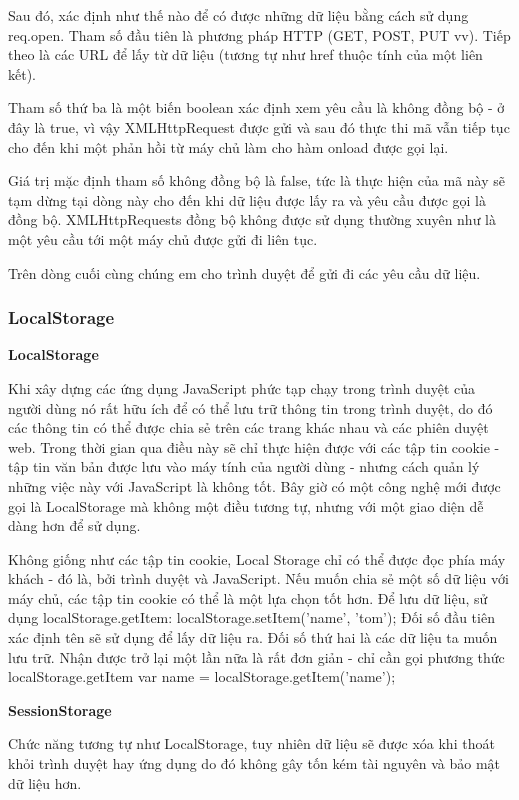 Sau đó, xác định như thế nào để có được những dữ liệu bằng cách sử dụng req.open. Tham số đầu tiên là phương pháp HTTP (GET, POST, PUT vv). Tiếp theo là các URL để lấy từ dữ liệu (tương tự như href thuộc tính của một liên kết).

Tham số thứ ba là một biến boolean xác định xem yêu cầu là không đồng bộ - ở đây là true, vì vậy XMLHttpRequest được gửi và sau đó thực thi mã vẫn tiếp tục cho đến khi một phản hồi từ máy chủ làm cho hàm onload được gọi lại.

Giá trị mặc định tham số không đồng bộ là false, tức là thực hiện của mã này sẽ tạm dừng tại dòng này cho đến khi dữ liệu được lấy ra và yêu cầu được gọi là đồng bộ. XMLHttpRequests đồng bộ không được sử dụng thường xuyên như là một yêu cầu tới một máy chủ được gửi đi liên tục.

Trên dòng cuối cùng chúng em cho trình duyệt để gửi đi các yêu cầu dữ liệu.

\subsubsection{LocalStorage}

\textbf{LocalStorage}

Khi xây dựng các ứng dụng JavaScript phức tạp chạy trong trình duyệt của người dùng nó rất hữu ích để có thể lưu trữ thông tin trong trình duyệt, do đó các thông tin có thể được chia sẻ trên các trang khác nhau và các phiên duyệt web.
Trong thời gian qua điều này sẽ chỉ thực hiện được với các tập tin cookie - tập tin văn bản được lưu vào máy tính của người dùng - nhưng cách quản lý những việc này với JavaScript là không tốt. Bây giờ có một công nghệ mới được gọi là LocalStorage mà không một điều tương tự, nhưng với một giao diện dễ dàng hơn để sử dụng.

Không giống như các tập tin cookie, Local Storage chỉ có thể được đọc phía máy khách - đó là, bởi trình duyệt và JavaScript. Nếu muốn chia sẻ một số dữ liệu với máy chủ, các tập tin cookie có thể là một lựa chọn tốt hơn.
Để lưu dữ liệu, sử dụng localStorage.getItem:
localStorage.setItem('name', 'tom'); 
Đối số đầu tiên xác định tên sẽ sử dụng để lấy dữ liệu ra. Đối số thứ hai là các dữ liệu ta muốn lưu trữ.
Nhận được trở lại một lần nữa là rất đơn giản - chỉ cần gọi phương thức localStorage.getItem
var name = localStorage.getItem('name');


\textbf{SessionStorage}

Chức năng tương tự như LocalStorage, tuy nhiên dữ liệu sẽ được xóa khi thoát khỏi trình duyệt hay ứng dụng do đó không gây tốn kém tài nguyên và bảo mật dữ liệu hơn.


